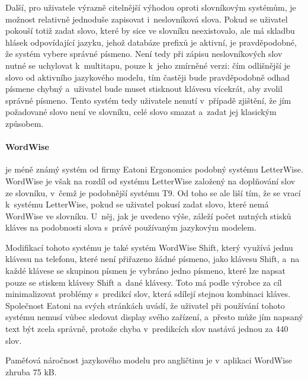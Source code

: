 \documentclass[a4paper,11pt,openany]{book} %
\begin{document}
Další, pro uživatele výrazně citelnější výhodou oproti slovníkovým systémům, je možnost relativně jednoduše zapisovat i~neslovníková slova. Pokud se uživatel pokouší totiž zadat slovo, které by sice ve slovníku neexistovalo, ale má skladbu hlásek odpovídající jazyku, jehož databáze prefixů je aktivní, je pravděpodobné, že systém vybere správné písmeno. Není tedy při zápisu neslovníkových slov nutné se uchylovat k~multitapu, pouze k~jeho zmírněné verzi: čím odlišnější je slovo od aktivního jazykového modelu, tím častěji bude pravděpodobně odhad písmene chybný a~uživatel bude muset stisknout klávesu vícekrát, aby zvolil správné písmeno. Tento systém tedy uživatele nenutí v~případě zjištění, že jím požadované slovo není ve slovníku, celé slovo smazat a~zadat jej klasickým způsobem. \parencite[5234]{ghayoomi2009overview} \parencite[112]{MacKenzie2001} 

\paragraph{WordWise}

je méně známý systém od firmy Eatoni Ergonomics podobný systému LetterWise. WordWise je však na rozdíl od systému LetterWise založený na doplňování slov ze slovníku, v~čemž je podobnější systému T9. Od toho se ale liší tím, že se vrací k~systému LetterWise, pokud se uživatel pokusí zadat slovo, které nemá WordWise ve slovníku. U~něj, jak je uvedeno výše, záleží počet nutných stisků kláves na podobnosti slova s~právě používaným jazykovým modelem. \parencite{eatoniwordwise}

Modifikací tohoto systému je také systém WordWise Shift, který využívá jednu klávesu na telefonu, které není přiřazeno žádné písmeno, jako klávesu Shift, a~na každé klávese se skupinou písmen je vybráno jedno písmeno, které lze napsat pouze se stiskem klávesy Shift a~dané klávesy. Toto má podle výrobce za cíl minimalizovat problémy s~predikcí slov, která sdílejí stejnou kombinaci kláves. Společnost Eatoni na svých stránkách uvádí, že uživatel při používání tohoto systému nemusí vůbec sledovat display svého zařízení, a~přesto  může jím napsaný text být zcela správně, protože chyba v~predikcích slov nastává jednou za 440 slov. \parencite{eatoniwordwise}

Paměťová náročnost jazykového modelu pro angličtinu je v~aplikaci WordWise zhruba 75 kB. \parencite{eatoniwordwise} %
\end{document}
